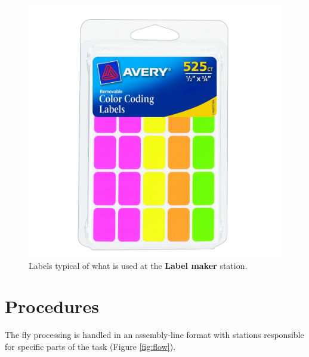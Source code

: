 \documentclass[letterpaper]{scrreprt}
\begin{document}
\begin{figure}[htbp]
\centering
\includegraphics{figures/label_pad.jpg}
\caption{Labels typical of what is used at the \textbf{Label maker}
station. \label{fig:labels}}
\end{figure}

\section{Procedures}\label{procedures-1}

The fly processing is handled in an assembly-line format with stations
responsible for specific parts of the task (Figure \ref{fig:flow}).
\end{document}
